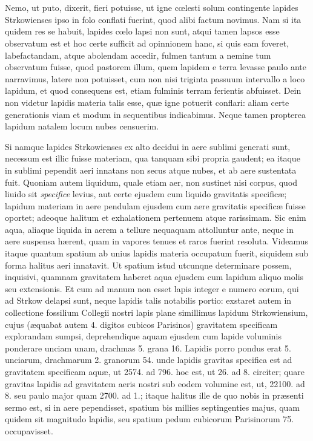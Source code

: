 \documentclass[a4paper, 11pt, oneside, polutonikogreek, latin]{article}
\begin{document}
\section[Ostenditur lapides non esse generatos in aere sublimi.]{}
\paragraph{}
Nemo, ut puto, dixerit, fieri potuisse, ut igne cœlesti solum contingente lapides Strkowienses ipso in folo conflati fuerint, quod alibi factum novimus. Nam si ita quidem res se habuit, lapides cœlo lapsi non sunt, atqui tamen lapsos esse observatum est et hoc certe sufficit ad opinnionem hanc, si quis eam foveret, labefactandam, atque abolendam accedir, fulmen tantum a nemine tum observatum fuisse, quod pastorem illum, quem lapidem e terra levasse paulo ante narravimus, latere non potuisset, cum non nisi triginta passuum intervallo a loco lapidum, et quod consequens est, etiam fulminis terram ferientis abfuisset. Dein non videtur lapidis materia talis esse, quæ igne potuerit conflari: aliam certe generationis viam et modum in sequentibus indicabimus. Neque tamen propterea lapidum natalem locum nubes censuerim.

Si namque lapides Strkowienses ex alto decidui in aere sublimi generati sunt, necessum est illic fuisse materiam, qua tanquam sibi propria gaudent; ea itaque in sublimi pependit aeri innatans non secus atque nubes, et ab aere sustentata fuit. Quoniam autem liquidum, quale etiam aer, non sustinet nisi corpus, quod liuido sit \emph{specifice} levius, aut certe ejusdem cum liquido gravitatis specificæ; lapidum materiam in aere pendulam ejusdem cum aere gravitatis specificæ fuisse oportet; adeoque halitum et exhalationem pertenuem atque rarissimam. Sic enim aqua, aliaque liquida in aerem a tellure nequaquam attolluntur ante, neque in aere suspensa hærent, quam in vapores tenues et raros fuerint resoluta. Videamus itaque quantum spatium ab unius lapidis materia occupatum fuerit, siquidem sub forma halitus aeri innatavit. Ut spatium istud utcunqne determinare possem, inquisivi, quamnam gravitatem haberet aqua ejusdem cum lapidum aliquo molis seu extensionis. Et cum ad manum non esset lapis integer e numero eorum, qui ad Strkow delapsi sunt, neque lapidis talis notabilis portio: exstaret autem in collectione fossilium Collegii nostri lapis plane simillimus lapidum Strkowiensium, cujus (æquabat autem 4. digitos cubicos Parisinos) gravitatem specificam explorandam sumpsi, deprehendique aquam ejusdem cum lapide voluminis ponderare unciam unam, drachmas 5. grana 16. Lapidis porro pondus erat 5. unciarum, drachmarum 2. granorum 54. unde lapidis gravitas specifica est ad gravitatem specificam aquæ, ut 2574. ad 796. hoc est, ut 26. ad 8. circiter; quare gravitas lapidis ad gravitatem aeris nostri sub eodem volumine est, ut, 22100. ad 8. seu paulo major quam 2700. ad 1.; itaque halitus ille de quo nobis in præsenti sermo est, si in aere pependisset, spatium bis millies septingenties majus, quam quidem sit magnitudo lapidis, seu spatium pedum cubicorum Parisinorum 75. occupavisset.
\end{document}
